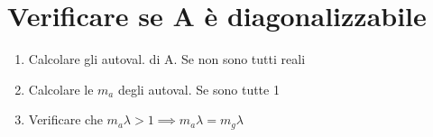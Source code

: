 \section{Verificare se A è diagonalizzabile}
\begin{enumerate}[noitemsep]
	\item Calcolare gli autoval. di A. Se non sono tutti reali \Frowny{}
	\item Calcolare le $m_a$ degli autoval. Se sono tutte 1 \Smiley{}
	\item Verificare che $m_a \lambda > 1 \implies m_a \lambda = m_g \lambda$ \Smiley{}
\end{enumerate}
